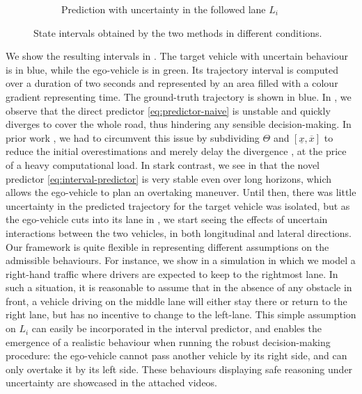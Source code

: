 \begin{figure}
\begin{center}
\begin{subfigure}[b]{0.75\linewidth}
		\caption{Prediction with uncertainty in the followed lane $L_i$}
		\label{sub:hw-d}
	\end{subfigure}
	\end{center}
	\caption{State intervals obtained by the two methods in different conditions.}
	\label{fig:highway}
\end{figure}


We show the resulting intervals in . The target vehicle with uncertain behaviour is in blue, while the ego-vehicle is in green. Its trajectory interval is computed over a duration of two seconds and represented by an area filled with a colour gradient representing time. The ground-truth trajectory is shown in blue. In , we observe that the direct predictor \eqref{eq:predictor-naive} is unstable and quickly diverges to cover the whole road, thus hindering any sensible decision-making. In prior work \citep{Leurent2018approximate}, we had to circumvent this issue by subdividing $\Theta$ and $[\underline{x}, \overline{x}]$ to reduce the initial overestimations and merely delay the divergence \citep{Adrot2003}, at the price of a heavy computational load. In stark contrast, we see in  that the novel predictor \eqref{eq:interval-predictor} is very stable even over long horizons, which allows the ego-vehicle to plan an overtaking maneuver. Until then, there was little uncertainty in the predicted trajectory for the target vehicle was isolated, but as the ego-vehicle cuts into its lane in , we start seeing the  effects of uncertain interactions between the two vehicles, in both longitudinal and lateral directions. Our framework is quite flexible in representing different assumptions on the admissible behaviours. For instance, we show in  a simulation in which we model a right-hand traffic where drivers are expected to keep to the rightmost lane. In such a situation, it is reasonable to assume that in the absence of any obstacle in front, a vehicle driving on the middle lane will either stay there or return to the right lane, but has no incentive to change to the left-lane. This simple assumption on $L_i$ can easily be incorporated in the interval predictor, and enables the emergence of a realistic behaviour when running the robust decision-making procedure: the ego-vehicle cannot pass another vehicle by its right side, and can only overtake it by its left side. These behaviours displaying safe reasoning under uncertainty are showcased in the attached videos.


